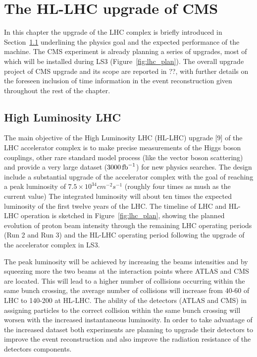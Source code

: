 \providecommand{\sixbysix}{\ensuremath{6\times 6\mathrm{~cm}^{2}}\xspace}
\providecommand{\threebythree}{\ensuremath{3\times 3\mathrm{~cm}^{2}}\xspace}
\providecommand{\twobytwo}{\ensuremath{2\times 2\mathrm{~cm}^{2}}\xspace}
\providecommand{\onebyone}{\ensuremath{1\times 1\mathrm{~cm}^{2}}\xspace}
\providecommand{\relChIso}{\ensuremath{Ch_{iso}/p_T^{muon}}}

\chapter{The HL-LHC upgrade of CMS}
\label{chapter:cms_upgrade}

In this chapter the upgrade of the LHC complex is briefly introduced in Section~\ref{upgrade_lhc}
underlining the physics goal and the expected performance of the machine. The CMS experiment is already planning
a series of upgrades, most of which will be installed during LS3 (Figure~\ref{fig:lhc_plan}).
The overall upgrade project of CMS upgrade and its scope are reported in ??, with further details on the
foreseen inclusion of time information in the event reconstruction given throughout the rest of the chapter.

\section{High Luminosity LHC}
\label{upgrade_lhc}

The main objective of the High Luminosity LHC (HL-LHC) upgrade [9] of the LHC accelerator complex
is to make precise measurements of the Higgs boson couplings, other rare standard model process (like the vector boson scattering)
and provide a very large dataset ($3000\mathrm{\,fb}^{-1}$) for new physics searches.
The design include a substantial upgrade of the accelerator complex with the goal of reaching
a peak luminosity of $7.5\times10^{34} cm^{-2}s^{-1}$ (roughly four times as mush as the current value)
The integrated luminosity will about ten times the expected luminosity of the first twelve
years of the LHC.
The timeline of LHC and HL-LHC operation is sketched in Figure~\ref{fig:lhc_plan}, showing the planned
evolution of proton beam intensity through the remaining LHC operating periods (Run 2 and Run 3)
and the HL-LHC operating period following the upgrade of the accelerator complex in LS3.

The peak luminosity will be achieved by increasing the beams intensities and by squeezing more the two beams at the
interaction points where ATLAS and CMS are located.
This will lead to a higher number of collisions occurring within the same bunch crossing, the
average number of collisions will increase from 40-60 of LHC to 140-200 at HL-LHC.
The ability of the detectors (ATLAS and CMS) in assigning particles to the correct collision within the same bunch crossing
will worsen with the increased instantaneous luminosity. In order to take advantage of the increased dataset
both experiments are planning to upgrade their detectors to improve the event reconstruction and also improve
the radiation resistance of the detectors components.


